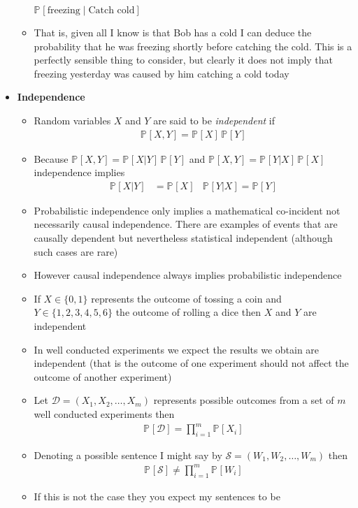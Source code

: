 \documentclass[11pt]{article}
\newcommand{\Prob}[2][]{\mathbb{P}_{#1\!}\left[ #2 \right]}
\begin{document}
\begin{itemize}
\begin{itemize}
\(\Prob{\text{freezing}\mid \text{Catch cold}}\)
\item That is, given all I know is that Bob has a cold I can deduce
the probability that he was freezing shortly before catching the
cold. This is a perfectly sensible thing to consider, but
clearly it does not imply that freezing yesterday was caused by
him catching a cold today
\end{itemize}
\item \textbf{Independence}
\begin{itemize}
\item Random variables \(X\) and \(Y\) are said to be \emph{independent} if
\begin{align*}
  \Prob{X, Y} = \Prob{X}\,\Prob{Y}
\end{align*}
\item Because \(\Prob{X,Y}= \Prob{X|Y}\,\Prob{Y}\) and \(\Prob{X,Y}=
      \Prob{Y|X}\,\Prob{X}\) independence implies
\begin{align*}
  \Prob{X|Y} &= \Prob{X} & \Prob{Y|X} = \Prob{Y}
\end{align*}
\item Probabilistic independence only implies a mathematical co-incident not
necessarily causal independence.  There are examples of events
that are causally dependent but nevertheless statistical
independent (although such cases are rare)
\item However causal independence always implies probabilistic independence
\item If \(X\in\{0,1\}\) represents the outcome of tossing a coin and
\(Y\in\{1,2,3,4,5,6\}\) the outcome of rolling a dice then \(X\) and \(Y\)
are independent
\item In well conducted experiments we expect the results we obtain
are independent (that is the outcome of one experiment should
not affect the outcome of another experiment)
\item Let \(\mathcal{D} = (X_1, X_2, \ldots, X_m)\) represents
possible outcomes from a set of \(m\) well conducted
experiments then
\begin{align*}
  \Prob{\mathcal{D}} = \prod_{i=1}^m \Prob{X_i}
\end{align*}
\item Denoting a possible sentence I might say by
\(\mathcal{S}=(W_1, W_2,\ldots,W_m)\) then
\begin{align*}
  \Prob{\mathcal{S}} \neq  \prod_{i=1}^m \Prob{W_i}
\end{align*}
\item If this is not the case they you expect my sentences to be

\end{itemize}
\end{itemize}
\end{document}
